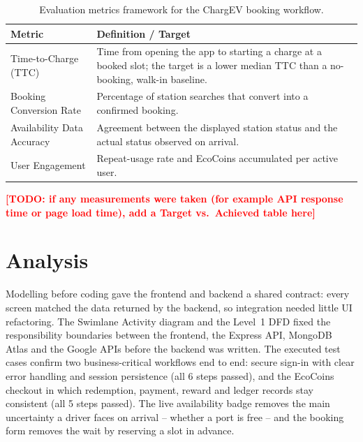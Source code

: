 \documentclass{tietreport}
\newcommand{\todo}[1]{\textcolor{red}{\textbf{[TODO: #1]}}}
\begin{document}
\begin{table}[H]
\centering
\caption{Evaluation metrics framework for the ChargEV booking workflow.}
\label{tab:metrics}
\begin{tabularx}{\textwidth}{lX}
  \toprule
  \textbf{Metric} & \textbf{Definition / Target} \\
  \midrule
  Time-to-Charge (TTC) & Time from opening the app to
    starting a charge at a booked slot; the target is a
    lower median TTC than a no-booking, walk-in
    baseline. \\
  Booking Conversion Rate & Percentage of station
    searches that convert into a confirmed booking. \\
  Availability Data Accuracy & Agreement between the
    displayed station status and the actual status
    observed on arrival. \\
  User Engagement & Repeat-usage rate and EcoCoins
    accumulated per active user. \\
  \bottomrule
\end{tabularx}
\end{table}

\todo{if any measurements were taken (for example API response time or page load time), add a Target vs.\ Achieved table here}

\section{Analysis}

Modelling before coding gave the frontend and backend a
shared contract: every screen matched the data returned by
the backend, so integration needed little UI refactoring.
The Swimlane Activity diagram and the Level~1 DFD fixed the
responsibility boundaries between the frontend, the Express
API, MongoDB Atlas and the Google APIs before the backend
was written. The executed test cases confirm two
business-critical workflows end to end: secure sign-in with
clear error handling and session persistence (all 6 steps
passed), and the EcoCoins checkout in which redemption,
payment, reward and ledger records stay consistent (all 5
steps passed). The live availability badge removes the main
uncertainty a driver faces on arrival -- whether a port is
free -- and the booking form removes the wait by reserving
a slot in advance.

\end{document}
